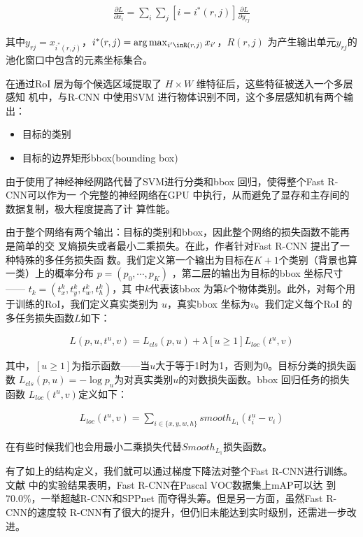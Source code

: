 \begin{align}
\frac{\partial L}{\partial x_i} = \sum_{i}\sum_{j}[i = i^*(r,j)]\frac{\partial
  L}{\partial y_{rj}}
\end{align}

其中$y_{rj} = x_{i^*(r,j)}$，$i^*(r,j) = \arg\max_{i'\inR(r,j)}x_{i'}$，$R(r,j)$
为产生输出单元$y_{rj}$的池化窗口中包含的元素坐标集合。

在通过RoI 层为每个候选区域提取了 $H \times W$ 维特征后，这些特征被送入一个多层感知
机中，与R-CNN 中使用SVM 进行物体识别不同，这个多层感知机有两个输出：

\begin{itemize}
  \item 目标的类别
  \item 目标的边界矩形bbox(bounding box)
\end{itemize}

由于使用了神经神经网路代替了SVM进行分类和bbox 回归，使得整个Fast R-CNN可以作为一
个完整的神经网络在GPU 中执行，从而避免了显存和主存间的数据复制，极大程度提高了计
算性能。

由于整个网络有两个输出：目标的类别和bbox，因此整个网络的损失函数不能再是简单的交
叉熵损失或者最小二乘损失。在此，作者针对Fast R-CNN 提出了一种特殊的多任务损失函
数。我们定义第一个输出为目标在$K+1$个类别（背景也算一类）上的概率分布 $p = (p_0,
\cdots, p_K)$ ，第二层的输出为目标的bbox 坐标尺寸 —— $t_k = (t_x^k, t_y^k, t_w^k, t_h^k)$，其
中$k$代表该bbox 为第$k$个物体类别。此外，对每个用于训练的RoI，我们定义真实类别为
$u$，真实bbox 坐标为$v$。我们定义每个RoI 的多任务损失函数$L$如下：

\begin{align}
L(p, u, t^u, v) = L_{cls}(p, u) + \lambda[u \geq 1]L_{loc}(t^u, v)
\end{align}

其中，$[u \geq 1]$为指示函数——当$u$大于等于1时为1，否则为0。目标分类的损失函数
$L_{cls}(p,u) = -\log{p_u}$为对真实类别$u$的对数损失函数。bbox 回归任务的损失函数
$L_{loc}(t^u,v)$定义如下：

\begin{align}
L_{loc}(t^u, v) = \sum_{i\in \{x,y,w,h\}}{smooth_{L_1}(t_i^u-v_i)}
\end{align}

在有些时候我们也会用最小二乘损失代替$Smooth_{L_1}$损失函数。

有了如上的结构定义，我们就可以通过梯度下降法对整个Fast R-CNN进行训练。文献
\cite{Girshick:2015ib}中的实验结果表明，Fast R-CNN在Pascal VOC数据集上mAP可以达
到70.0\%，一举超越R-CNN和SPPnet 而夺得头筹。但是另一方面，虽然Fast R-CNN的速度较
R-CNN有了很大的提升，但仍旧未能达到实时级别，还需进一步改进。

